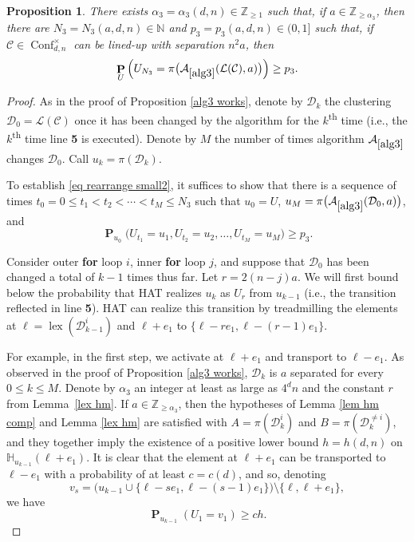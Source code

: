 \documentclass[11pt,reqno]{amsart}
\newtheorem{proposition}[lemma]{Proposition}
\theoremstyle{definition}
\numberwithin{equation}{section}
\newcommand{\N}{\mathbb{N}}
\newcommand{\Z}{\mathbb{Z}}
\newcommand{\1}{\mathbf{1}}
\renewcommand{\H}{\mathbb{H}}
\DeclareMathOperator{\PP}{\mathbf{P}}
\DeclareMathOperator{\lex}{lex}
\newcommand{\CC}{\mathcal{C}}
\newcommand{\DD}{\mathcal{D}}
\DeclareMathOperator{\Conf}{\mathrm{Conf}}
\begin{document}
\begin{proposition}\label{break lines}
There exists $\alpha_3 = \alpha_3 (d,n) \in \Z_{\geq 1}$ such that, if $a \in \Z_{\geq \alpha_3}$, then there are $N_3 = N_3 (a,d,n) \in \N$ and $p_3 = p_3 (a,d,n) \in (0,1]$ such that, if $\CC \in \Conf_{d,n}^\times$ can be lined-up with separation $n^2 a$, then 
\begin{equation}\label{eq rearrange small2}
\PP_{U} \Big( U_{N_3} = \pi \big( \mathcal{A}_{\ref{alg3}} (\mathcal{L}(\CC),a) \big) \Big) \geq p_3.
\end{equation}
\end{proposition}

\begin{proof}
As in the proof of Proposition \ref{alg3 works}, denote by $\DD_k$ the clustering $\DD_0 = \mathcal{L} (\CC)$ once it has been changed by the algorithm for the $k$\textsuperscript{th} time (i.e., the $k$\textsuperscript{th} time line {\bf 5} is executed). Denote by $M$ the number of times algorithm $\mathcal{A}_{\ref{alg3}}$ changes $\DD_0$. Call $u_k = \pi (\DD_k)$.

To establish \eqref{eq rearrange small2}, it suffices to show that there is a sequence of times $t_0 = 0 \leq t_1 < t_2 < \cdots < t_M \leq N_3$ such that $u_{0} = U$, $u_{M} = \pi \big( \mathcal{A}_{\ref{alg3}} (\DD_0,a) \big)$, and
\begin{equation}\label{alg3 bd1}
\PP_{u_0} \big( U_{t_1} = u_1, U_{t_2} = u_2, \dots, U_{t_M} = u_{M} \big) \geq p_3.
\end{equation}

Consider outer {\bf for} loop $i$, inner {\bf for} loop $j$, and suppose that $\DD_0$ has been changed a total of $k-1$ times thus far. Let $r = 2(n-j)a$. We will first bound below the probability that HAT realizes $u_k$ as $U_{r}$ from $u_{k-1}$ (i.e., the transition reflected in line {\bf 5}). HAT can realize this transition by treadmilling the elements at $\ell = \lex (\DD_{k-1}^i)$ and $\ell+e_1$ to $\{\ell - re_1,\ell-(r-1)e_1\}$.

For example, in the first step, we activate at $\ell+e_1$ and transport to $\ell-e_1$. As observed in the proof of Proposition \ref{alg3 works}, $\DD_k$ is $a$ separated for every $0 \leq k \leq M$. Denote by $\alpha_3$ an integer at least as large as $4^d n$ and the constant $r$ from Lemma~\ref{lex hm}. If $a \in \Z_{\geq \alpha_3}$, then the hypotheses of Lemma \ref{lem hm comp} and Lemma \ref{lex hm} are satisfied with $A = \pi (\DD_k^i)$ and $B = \pi (\DD_k^{\neq i})$, and they together imply the existence of a positive lower bound $h = h(d,n)$ on $\H_{u_{k-1}} (\ell+e_1)$. It is clear that the element at $\ell+e_1$ can be transported to $\ell-e_1$ with a probability of at least $c = c(d)$, and so, denoting
\[
v_s = \big( u_{k-1} \cup \{\ell-s e_1,\ell - (s-1) e_1 \} \big) {\setminus} \{ \ell,\ell+e_1\},
\]
we have
\begin{equation*}
\PP_{u_{k-1}} ( U_1 = v_1 ) \geq ch.
\end{equation*}


\end{proof}
\end{document}
